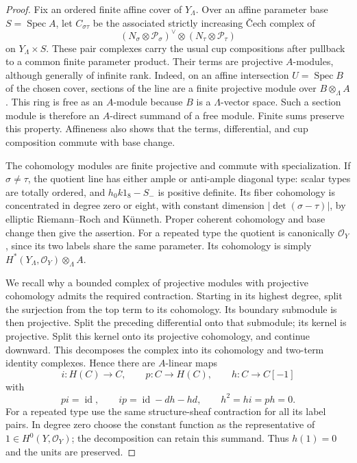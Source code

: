 \documentclass[11pt]{article}
\theoremstyle{definition}
\theoremstyle{remark}
\numberwithin{equation}{section}
\begin{document}
\begin{proof}
Fix an ordered finite affine cover of $Y_\Lambda$.  Over an affine
parameter base $S=\operatorname{Spec} A$, let $C_{\sigma\tau}$ be the associated
strictly increasing \v Cech complex of
\[
 (N_\sigma\otimes\mathcal P_\sigma)^\vee
          \otimes(N_\tau\otimes\mathcal P_\tau)
\]
on $Y_\Lambda\times S$.  These pair complexes carry the usual cup
compositions after pullback to a common finite parameter product.
Their terms are projective $A$-modules, although generally of
infinite rank.  Indeed, on an affine intersection $U=\operatorname{Spec} B$ of
the chosen cover, sections of the line are a finite projective
module over $B\otimes_\Lambda A$.  This ring is free as an
$A$-module because $B$ is a $\Lambda$-vector space.  Such a section
module is therefore an $A$-direct summand of a free module.  Finite
sums preserve this property.  Affineness also shows that the terms,
differential, and cup composition commute with base change.

The cohomology modules are finite projective and commute with
specialization.  If $\sigma\ne\tau$, the quotient line has either
ample or anti-ample diagonal type: scalar types are totally ordered,
and $h_0k1_8-S_-$ is positive definite.  Its fiber cohomology is
concentrated in degree zero or eight, with constant dimension
$|\det(\sigma-\tau)|$, by elliptic Riemann--Roch and K\"unneth.
Proper coherent cohomology and base change then give the assertion.
For a repeated type the quotient is canonically $\mathcal O_Y$, since its
two labels share the same parameter.  Its cohomology is simply
$H^*(Y_\Lambda,\mathcal O_Y)\otimes_\Lambda A$.

We recall why a bounded complex of projective modules with
projective cohomology admits the required contraction.  Starting
in its highest degree, split the surjection from the top term to
its cohomology.  Its boundary submodule is then projective.  Split
the preceding differential onto that submodule; its kernel is
projective.  Split this kernel onto its projective cohomology, and
continue downward.  This decomposes the complex into its cohomology
and two-term identity complexes.  Hence there are $A$-linear maps
\[
 i:H(C)\to C,\qquad p:C\to H(C),\qquad h:C\to C[-1]
\]
with
\begin{equation}
 pi=\operatorname{id},\qquad ip=\operatorname{id}-dh-hd,\qquad
 h^2=hi=ph=0.
 \label{mirror:contraction}
\end{equation}
For a repeated type use the same structure-sheaf contraction for
all its label pairs.  In degree zero choose the constant function
as the representative of $1\in H^0(Y,\mathcal O_Y)$; the decomposition
can retain this summand.  Thus $h(1)=0$ and the units are preserved.


\end{proof}
\end{document}
